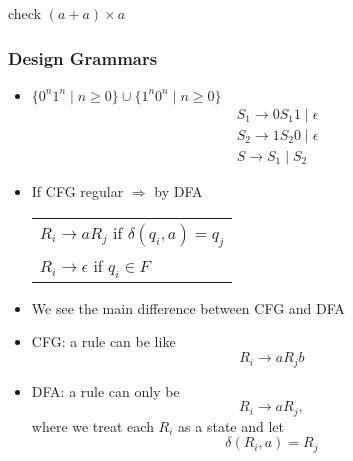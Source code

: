 \begin{frame}[allowframebreaks]
\begin{itemize}
check $(a+a) \times a$

\framebreak

\end{itemize}\end{frame} \begin{frame}[allowframebreaks] \frametitle{Design Grammars}
  \begin{itemize}
\item $\{0^n 1^n \mid n\geq 0\}
\cup \{1^n 0^n \mid n \geq 0\}$
\begin{equation*}
  \begin{split}
& S_1 \rightarrow 0 S_1 1 \mid \epsilon \\
& S_2 \rightarrow 1 S_2 0 \mid \epsilon \\
& S \rightarrow S_1 \mid S_2
\end{split}
\end{equation*}
\item If CFG regular $\Rightarrow $
by DFA

\begin{center}
  \begin{tabular}{l}
$R_i \rightarrow a R_j$ if $\delta(q_i,a)
= q_j$ \\
$R_i \rightarrow \epsilon$ if $q_i \in F$
  \end{tabular}
\end{center}
\item We see the main difference between CFG and DFA

  
\item [] CFG: a rule can be like
  \begin{equation*}
  R_i \rightarrow a R_j b
\end{equation*}
\item [] DFA: a rule can only be
  \begin{equation*}
  R_i \rightarrow a R_j,
\end{equation*}
where we treat each $R_i$ as a state and let
\begin{equation*}
  \delta(R_i, a) = R_j
\end{equation*}


\end{itemize}
\end{frame}
